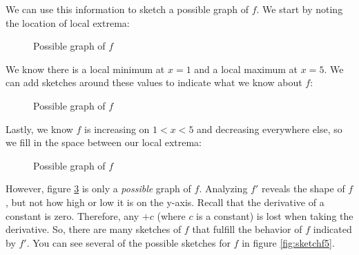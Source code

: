 We can use this information to sketch a possible graph of $f$. We start by 
noting the location of local extrema:
\begin{figure}[H]
	\centering
	\caption{Possible graph of $f$}
	\label{fig:sketchf2}
\end{figure}

We know there is a local minimum at $x=1$ and a local maximum at $x=5$. We can 
add sketches around these values to indicate what we know about $f$:
\begin{figure}[H]
	\centering
	\caption{Possible graph of $f$}
	\label{fig:sketchf3}
\end{figure}

Lastly, we know $f$ is increasing on $1<x<5$ and decreasing everywhere else, so 
we fill in the space between our local extrema:
\begin{figure}[H]
	\centering
	\caption{Possible graph of $f$}
	\label{fig:sketchf4}
\end{figure}

However, figure \ref{fig:sketchf4} is only a \textit{possible} graph of $f$. 
Analyzing $f'$ reveals the shape of $f$, but not how high or low it is on the 
y-axis. Recall that the derivative of a constant is zero. Therefore, any $+c$ 
(where $c$ is a constant) is lost when taking the derivative. So, there are 
many sketches of $f$ that fulfill the behavior of $f$ indicated by $f'$. You 
can see several of the possible sketches for $f$ in figure \ref{fig:sketchf5}. 

